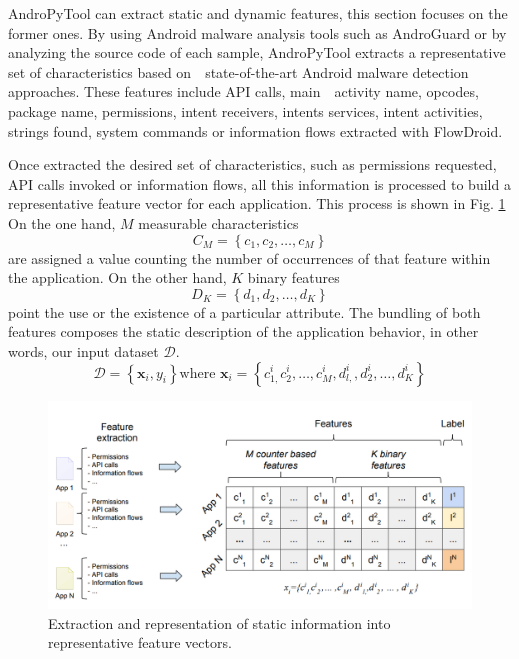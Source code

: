AndroPyTool can extract static and dynamic features, this section focuses on the
former ones. By using Android malware analysis tools such as AndroGuard or by analyzing the source code of each sample, AndroPyTool extracts a representative set of characteristics based on　state-of-the-art Android malware detection approaches. These features include API calls, main　activity name, opcodes, package name, permissions, intent receivers, intents services, intent activities, strings found, system commands or information flows extracted with FlowDroid.

Once extracted the desired set of characteristics, such as permissions requested, API calls
invoked or information flows, all this information is processed to build a representative feature
vector for each application. This process is shown in Fig. \ref{fig:featurevector} On the one hand, $M$ measurable
characteristics $$ C_{M}=\left\{c_{1}, c_{2}, \ldots, c_{M}\right\} $$ are assigned a value counting the number of occurrences of
that feature within the application. On the other hand, $K$ binary features $$
D_{K}=\left\{d_{1}, d_{2}, \ldots, d_{K}\right\}
$$
point the use or the existence of a particular attribute. The bundling of both features composes
the static description of the application behavior, in other words, our input dataset $\mathcal{D}$.
$$
\mathcal{D}=\left\{\mathbf{x}_{i}, y_{i}\right\} \text{where }
\mathbf{x}_{i}=\left\{c_{1,}^{i} c_{2}^{i}, \ldots, c_{M}^{i}, d_{l,}^{i}, d_{2}^{i}, \ldots, d_{K}^{i}\right\}
$$

\begin{figure}[htbp]
    \centering
    \includegraphics[scale=0.68]{./Figure/featurevector.png}
    \caption{Extraction and representation of static information into representative feature vectors. \cite{andropytool}}
    \label{fig:featurevector}
\end{figure}


